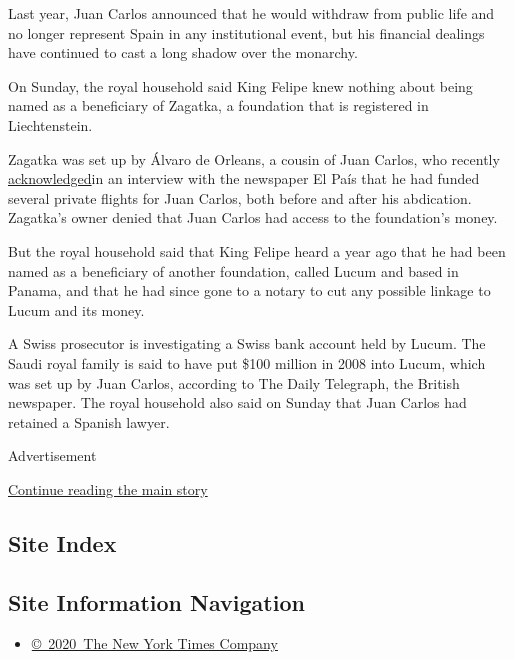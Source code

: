 Last year, Juan Carlos announced that he would withdraw from public life
and no longer represent Spain in any institutional event, but his
financial dealings have continued to cast a long shadow over the
monarchy.

On Sunday, the royal household said King Felipe knew nothing about being
named as a beneficiary of Zagatka, a foundation that is registered in
Liechtenstein.

Zagatka was set up by Álvaro de Orleans, a cousin of Juan Carlos, who
recently
\href{https://elpais.com/espana/2020-03-01/pague-muchos-vuelos-privados-del-rey-emerito-pero-no-soy-su-testaferro.html}{acknowledged}in
an interview with the newspaper El País that he had funded several
private flights for Juan Carlos, both before and after his abdication.
Zagatka's owner denied that Juan Carlos had access to the foundation's
money.

But the royal household said that King Felipe heard a year ago that he
had been named as a beneficiary of another foundation, called Lucum and
based in Panama, and that he had since gone to a notary to cut any
possible linkage to Lucum and its money.

A Swiss prosecutor is investigating a Swiss bank account held by Lucum.
The Saudi royal family is said to have put \$100 million in 2008 into
Lucum, which was set up by Juan Carlos, according to The Daily
Telegraph, the British newspaper. The royal household also said on
Sunday that Juan Carlos had retained a Spanish lawyer.

Advertisement

\protect\hyperlink{after-bottom}{Continue reading the main story}

\hypertarget{site-index}{%
\subsection{Site Index}\label{site-index}}

\hypertarget{site-information-navigation}{%
\subsection{Site Information
Navigation}\label{site-information-navigation}}

\begin{itemize}
\tightlist
\item
  \href{https://help.nytimes.com/hc/en-us/articles/115014792127-Copyright-notice}{©~2020~The
  New York Times Company}
\end{itemize}

